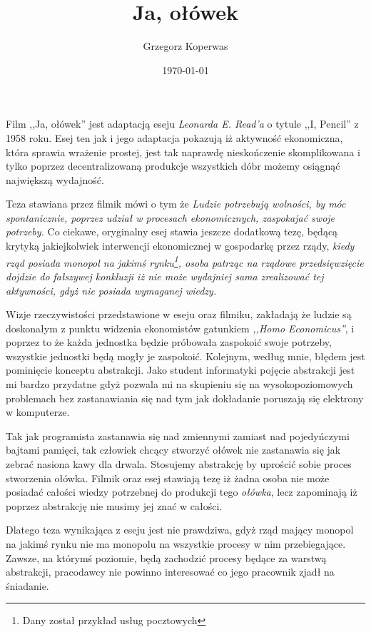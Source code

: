 \documentclass[a4paper,12pt]{article}
\title{Ja, ołówek}
\author{Grzegorz Koperwas}
\date{\today}
\begin{document}
\maketitle
\thispagestyle{fancy}

Film ,,Ja, ołówek'' jest adaptacją eseju \emph{Leonarda E. Read'a} o tytule ,,I, Pencil'' z 1958 roku. Esej ten jak i jego adaptacja pokazują iż aktywność ekonomiczna, która sprawia wrażenie prostej, jest tak naprawdę nieskończenie skomplikowana i tylko poprzez decentralizowaną produkcje wszystkich dóbr możemy osiągnąć największą wydajność.

Teza stawiana przez filmik mówi o tym że \emph{Ludzie potrzebują wolności, by móc spontanicznie, poprzez udział w procesach ekonomicznych, zaspokajać swoje potrzeby.} Co ciekawe, oryginalny esej stawia jeszcze dodatkową tezę, będącą krytyką jakiejkolwiek interwencji ekonomicznej w gospodarkę przez rządy, \emph{kiedy rząd posiada monopol na jakimś rynku\footnote{Dany został przykład usług pocztowych}, osoba patrząc na rządowe przedsięwzięcie dojdzie do fałszywej konkluzji iż nie może wydajniej sama zrealizować tej aktywności, gdyż nie posiada wymaganej wiedzy.}

Wizje rzeczywistości przedstawione w eseju oraz filmiku, zakładają że ludzie są doskonałym z punktu widzenia ekonomistów gatunkiem \emph{,,Homo Economicus''}, i poprzez to że każda jednostka będzie próbowała zaspokoić swoje potrzeby, wszystkie jednostki będą mogły je zaspokoić. 
Kolejnym, według mnie, błędem jest pominięcie konceptu abstrakcji. Jako student informatyki pojęcie abstrakcji jest mi bardzo przydatne gdyż pozwala mi na skupieniu się na wysokopoziomowych problemach bez zastanawiania się nad tym jak dokładanie poruszają się elektrony w komputerze.

Tak jak programista zastanawia się nad zmiennymi zamiast nad pojedyńczymi bajtami pamięci, tak człowiek chcący stworzyć ołówek nie zastanawia się jak zebrać nasiona kawy dla drwala. Stosujemy abstrakcję by uprościć sobie proces stworzenia ołówka. Filmik oraz esej stawiają tezę iż żadna osoba nie może posiadać całości wiedzy potrzebnej do produkcji tego \emph{ołówka}, lecz zapominają iż poprzez abstrakcję nie musimy jej znać w całości.

Dlatego teza wynikająca z eseju jest nie prawdziwa, gdyż rząd mający monopol na jakimś rynku nie ma monopolu na wszystkie procesy w nim przebiegające. Zawsze, na którymś poziomie, będą zachodzić procesy będące za warstwą abstrakcji, pracodawcy nie powinno interesować co jego pracownik zjadł na śniadanie.
\end{document}
